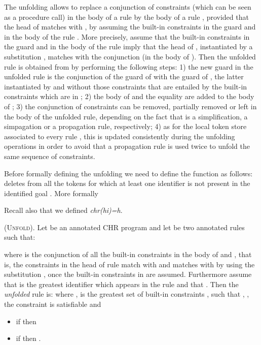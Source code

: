 \documentclass[final]{acmtrans2e}
\begin{document}
The unfolding allows to replace  a  conjunction  of constraints
(which can be seen as a procedure call) in the body of a rule 
by the body of a rule  ,  provided that the head of  matches
with , by assuming the built-in constraints in
the guard and in the body of the rule . More precisely, assume that
the built-in constraints in the guard and in the body
of the rule  imply that the head  of ,
instantiated by a substitution , matches with the
conjunction   (in the body of  ). Then the unfolded rule is
obtained from  by performing the following steps:  1) the new
guard in the unfolded rule is the conjunction of the guard of 
with the guard of , the latter instantiated by  and
without  those constraints that are entailed by the built-in
constraints which are in ; 2) the body of  and the equality
 are added to the body of ; 3) the conjunction of constraints  can
be removed, partially removed or left in the body of  the unfolded
rule, depending on the fact that  is a simplification, a
simpagation or a propagation rule, respectively; 4) as for the
local token store   associated to every rule , this is
updated consistently during the unfolding operations in order to
avoid that a propagation rule is used twice to unfold the same
sequence of constraints.


Before formally defining the unfolding we need to define the
function  as
follows:  deletes from  all the tokens for
which at least one identifier is not present in the identified
goal . More formally

Recall also that we defined  {\em chr(hi)=h}.

\begin{definition}\textsc{(Unfold).}\label{def:unf}
Let  be an annotated CHR program  and let  be two
annotated rules such that:

where  is the conjunction of all the built-in constraints in the body
of  and , that is, the constraints   in the head of rule
 match with  and  matches with  by using the substitution ,
once the built-in constraints in  are assumed. Furthermore assume that
 is the greatest identifier which appears in the
rule  and that .
Then the \emph{unfolded} rule is:
 where ,   is the greatest set of built-in constraints , such that ,
, the
constraint  is satisfiable and
\begin{itemize}
    \item if  then 
    \item if  then .
    \end{itemize}
\end{definition}
\end{document}

